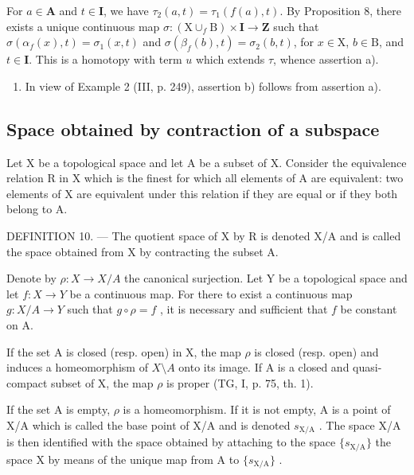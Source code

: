 For \(a \in \mathbf{A}\) and \(t \in \mathbf{I}\), we have \(\tau_2(a, t) = \tau_1(f(a), t)\). By Proposition 8, there exists a unique continuous map \(\sigma: (\mathrm{X} \cup_f \mathrm{B}) \times \mathbf{I} \to \mathbf{Z}\) such that \(\sigma(\alpha_f(x), t) = \sigma_1(x, t)\) and \(\sigma(\beta_f(b), t) = \sigma_2(b, t)\), for \(x \in \mathrm{X}\), \(b \in \mathrm{B}\), and \(t \in \mathbf{I}\). This is a homotopy with term \(u\) which extends \(\tau\), whence assertion a).

\begin{enumerate}
\def\labelenumi{\alph{enumi})}
\setcounter{enumi}{1}
\tightlist
\item
  In view of Example 2 (III, p. 249), assertion b) follows from assertion a).
\end{enumerate}

\subsection{Space obtained by contraction of a subspace}

Let X be a topological space and let A be a subset of X. Consider the equivalence relation R in X which is the finest for which all elements of A are equivalent: two elements of X are equivalent under this relation if they are equal or if they both belong to A.

DEFINITION 10. --- The quotient space of X by R is denoted X/A and is called the space obtained from X by contracting the subset A.

Denote by \(\rho\colon X\to X/A\) the canonical surjection. Let Y be a topological space and let \(f\colon X\to Y\) be a continuous map. For there to exist a continuous map \(g\colon X/A\to Y\) such that \(g\circ\rho=f\) , it is necessary and sufficient that \(f\) be constant on A.

If the set A is closed (resp. open) in X, the map \(\rho\) is closed (resp. open) and induces a homeomorphism of \(X\setminus A\) onto its image. If A is a closed and quasi-compact subset of X, the map \(\rho\) is proper (TG, I, p. 75, th. 1).

If the set A is empty, \(\rho\) is a homeomorphism. If it is not empty, A is a point of X/A which is called the base point of X/A and is denoted \(s_{\mathrm{X / A}}\) . The space X/A is then identified with the space obtained by attaching to the space \(\{s_{\mathrm{X / A}}\}\) the space X by means of the unique map from A to \(\{s_{\mathrm{X / A}}\}\) .

